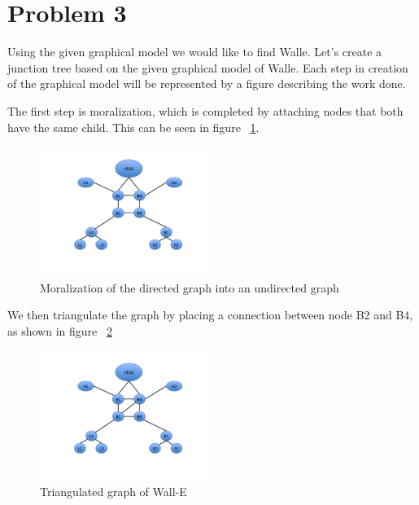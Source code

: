 \documentclass[paper=a4, fontsize=11pt]{scrartcl} %
\begin{document}

\section{Problem 3}
Using the given graphical model we would like to find Walle.  
Let's create a junction tree based on the given graphical model of Walle.
Each step in creation of the graphical model will be represented by a figure describing the work done. 

The first step is moralization, which is completed by attaching nodes that both have the same child.  This can be seen in figure ~\ref{fig:moralization}.

\begin{figure}
\centering
\includegraphics[width=0.5\textwidth]{Problem3/Slide1.png}
\caption{Moralization of the directed graph into an undirected graph}
\label{fig:moralization}
\end{figure}

We then triangulate the graph by placing a connection between node B2 and B4, as shown in figure ~\ref{fig:trig}

\begin{figure}
\centering
\includegraphics[width=0.5\textwidth]{Problem3/Slide2.png}
\caption{Triangulated graph of Wall-E}
\label{fig:trig}
\end{figure}
\end{document}
